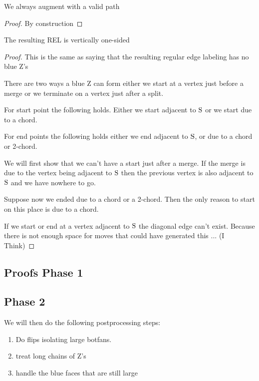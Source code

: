     \begin{lemma}
      \label{lm:}
      We always augment with a valid path
    \end{lemma}
    \begin{proof}
      By construction
    \end{proof}

    \begin{lemma}
      \label{lm:}
      The resulting REL is vertically one-sided
    \end{lemma}
    \begin{proof}
      This is the same as saying that the resulting regular edge labeling has no blue Z's

      There are two ways a blue Z can form either we start at a vertex just before a merge or we terminate on a vertex just after a split.

      For start point the following holds. Either we start adjacent to $\mathrm{S}$ or we start due to a chord.

      For end points the following holds either we end adjacent to $\mathrm{S}$, or due to a chord or 2-chord.


      We will first show that we can't have a start just after a merge.
      If the merge is due to the vertex being adjacent to $\mathrm{S}$ then the previous vertex is also adjacent to $\mathrm{S}$ and we have nowhere to go. 

      Suppose now we ended due to a chord or a 2-chord. Then the only reason to start on this place is due to a chord.

      If we start or end at a vertex adjacent to $\mathrm{S}$ the diagonal edge can't exist. Because there is not enough space for moves that could have generated this ... (I Think)



    \end{proof}


\subsection{Proofs Phase 1}

\subsection{Phase 2}
We will then do the following postprocessing steps:

\begin{enumerate}
  \item Do flips isolating large botfans.
  \item treat long chains of Z's
  \item handle the blue faces that are still large
\end{enumerate}

